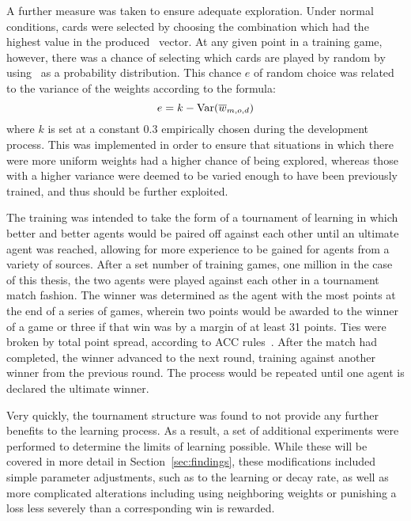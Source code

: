 \newcommand{\Var}{\mathrm{Var}}
A further measure was taken to ensure adequate exploration.
%
Under normal conditions,
cards were selected by choosing the combination which had the highest value in
the produced \pvec\ vector.
%
At any given point in a training game, however,
there was a chance of selecting which cards are played
by random by using \pvec\ as a probability distribution.
%
This chance $e$ of random choice was related to the variance of the 
weights according to the formula:
\[
	e = k - \Var(\wvecm_{m,o,d})
\]
where $k$ is set at a constant $0.3$ empirically chosen during the
development process.
%
This was implemented in order to ensure that situations in which there were
more uniform weights had a higher chance of being explored,
whereas those with a higher variance were deemed to be varied enough to
have been previously trained,
and thus should be further exploited.

The training was intended to take the form of a tournament of learning in which
better and better agents would be paired off against each other until an
ultimate agent was reached,
allowing for more experience to be gained for agents from a variety of sources.
%
After a set number of training games,
one million in the case of this thesis, 
the two agents were played against each other in a tournament match fashion.
%
The winner was determined as the agent with the most points at the end
of a series of games, %
wherein two points would be awarded to the winner of a game
or three if that win was by a margin of at least 31 points.
%
Ties were broken by total point spread,
according to ACC rules~\cite{ACC_rules}.
%
After the match had completed,
the winner advanced to the next round,
training against another winner from the previous round.
%
The process would be
repeated until one agent is declared the ultimate winner.

Very quickly,
the tournament structure was found to not provide any further benefits
to the learning process.
%
As a result,
a set of additional experiments were performed to determine the limits of
learning possible.
%
While these will be covered in more detail in Section~\ref{sec:findings},
these modifications included simple
parameter adjustments, such as to the learning or decay rate,
as well as
more complicated alterations 
including using neighboring weights
or punishing a loss less severely than a corresponding win is rewarded.

